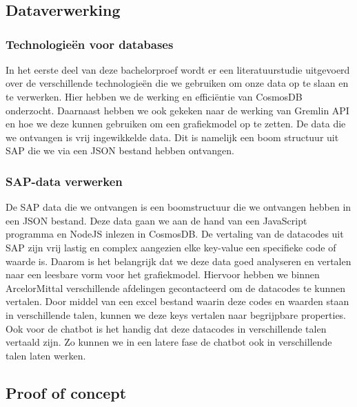 
\chapter{}%
\label{ch:methodologie}
\section{Dataverwerking}
\subsection{Technologieën voor databases}
In het eerste deel van deze bachelorproef wordt er een literatuurstudie uitgevoerd over de verschillende technologieën die we gebruiken om onze data op te slaan en te verwerken.
Hier hebben we de werking en efficiëntie van CosmosDB onderzocht. Daarnaast hebben we ook gekeken naar de werking van Gremlin API en hoe we deze kunnen gebruiken om een grafiekmodel op te zetten.
De data die we ontvangen is vrij ingewikkelde data. Dit is namelijk een boom structuur uit SAP die we via een JSON bestand hebben ontvangen.

\subsection{SAP-data verwerken}
De SAP data die we ontvangen is een boomstructuur die we ontvangen hebben in een JSON bestand. Deze data gaan we aan de hand van een JavaScript programma en NodeJS inlezen in CosmosDB.
De vertaling van de datacodes uit SAP zijn vrij lastig en complex aangezien elke key-value een specifieke code of waarde is. Daarom is het belangrijk dat we deze data goed analyseren en vertalen naar een leesbare vorm voor het grafiekmodel.
Hiervoor hebben we binnen ArcelorMittal verschillende afdelingen gecontacteerd om de datacodes te kunnen vertalen. Door middel van een excel bestand waarin deze codes en waarden staan in verschillende talen, kunnen we deze keys vertalen naar begrijpbare properties.
Ook voor de chatbot is het handig dat deze datacodes in verschillende talen vertaald zijn. Zo kunnen we in een latere fase de chatbot ook in verschillende talen laten werken.

\section{Proof of concept}

